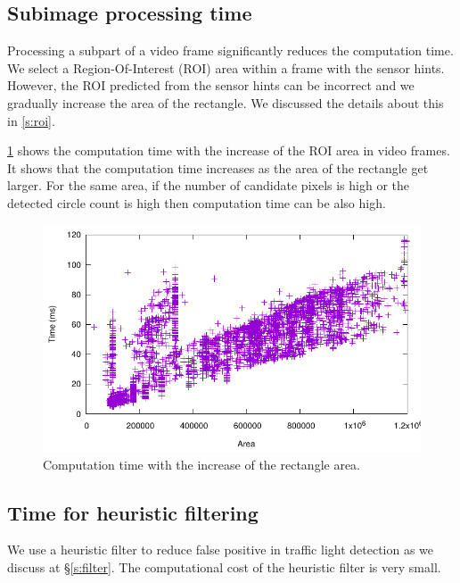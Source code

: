 \subsection{Subimage processing time}
Processing a subpart of a video frame significantly reduces the computation time. 
We select a Region-Of-Interest (ROI) area within a frame with the sensor hints.
However, the ROI predicted from the sensor hints can be incorrect and we gradually increase the area of the rectangle.
We discussed the details about this in \ref{s:roi}.


\ref{f:recarea} shows the computation time with the increase of the ROI area in video frames.
It shows that the computation time increases as the area of the rectangle get larger.
For the same area, if the number of candidate pixels is high or the detected circle count is high then computation time can be also high.

\begin{figure}[h!]
\centering
\includegraphics[width=5.2in]{plots/sunny_recarea.pdf}
\caption{Computation time with the increase of the rectangle area.}
\label{f:recarea}
\end{figure}



\subsection{Time for heuristic filtering}
We use a heuristic filter to reduce false positive in traffic light detection as we discuss at \S\ref{s:filter}.
The computational cost of the heuristic filter is very small.

